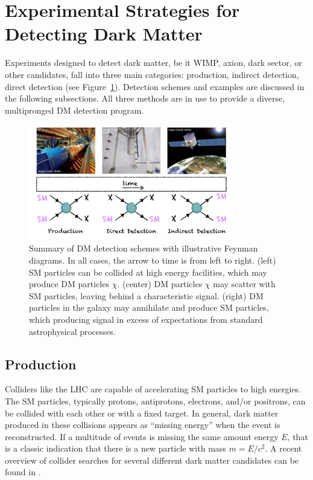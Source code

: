 \section{Experimental Strategies for Detecting Dark Matter}
Experiments designed to detect dark matter, be it \ac{WIMP}, axion, dark sector, or other candidates, fall into three main categories: production, indirect detection, direct detection (see Figure~\ref{fig:dm_detection_schemes}). Detection schemes and examples are discussed in the following subsections. All three methods are in use to provide a diverse, multipronged \ac{DM} detection program. 

\begin{figure}[htbp]
\begin{center}
\includegraphics[width=0.8\textwidth]{figures/theory/dm_detection_schemes.png}
\caption{Summary of \ac{DM} detection schemes with illustrative Feynman diagrams. In all cases, the arrow to time is from left to right. (left) \ac{SM} particles can be collided at high energy facilities, which may produce \ac{DM} particles $\chi$. (center) \ac{DM} particles $\chi$ may scatter with \ac{SM} particles, leaving behind a characteristic signal. (right) \ac{DM} particles in the galaxy may annihilate and produce \ac{SM} particles, which producing signal in excess of expectations from standard astrophysical processes.}
\label{fig:dm_detection_schemes}
\end{center}
\end{figure}

\subsection{Production}
Colliders like the \ac{LHC} are capable of accelerating \ac{SM} particles to high energies. The \ac{SM} particles, typically protons, antiprotons, electrons, and/or positrons, can be collided with each other or with a fixed target. In general, dark matter produced in these collisions appears as ``missing energy'' when the event is reconstructed. If a multitude of events is missing the same amount energy $E$, that is a classic indication that there is a new particle with mass $m = E/c^{2}$. A recent overview of collider searches for several different dark matter candidates can be found in \cite{Penning2018}. 

